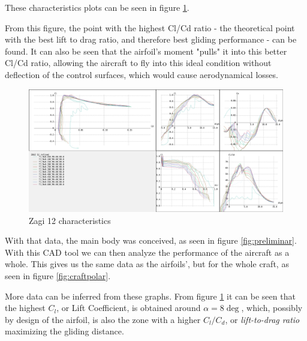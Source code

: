These characteristics plots can be seen in figure \ref{fig:zagi12polares}.
%

From this figure, the point with the highest Cl/Cd ratio - the theoretical point with the best lift to drag ratio, and therefore best gliding performance - can be found. It can also be seen that the airfoil's moment "pulls" it into this better Cl/Cd ratio, allowing the aircraft to fly into this ideal condition without deflection of the control surfaces, which would cause aerodynamical losses.


\begin{figure}
\centering
	  \includegraphics[width=\linewidth]{figs/polares.png}
  \caption{Zagi 12 characteristics}
  \label{fig:zagi12polares}
\end{figure}

With that data, the main body was conceived, as seen in figure \ref{fig:preliminar}. With this CAD tool we can then analyze the performance of the aircraft as a whole. This gives us the same data as the airfoils', but for the whole craft, as seen in figure \ref{fig:craftpolar}.

More data can be inferred from these graphs. From figure \ref{fig:zagi12polares} it can be seen that the highest $C_l$, or Lift Coefficient, is obtained around $\alpha = 8\deg$, which, possibly by design of the airfoil, is also the zone with a higher $C_l/C_d$, or \textit{lift-to-drag ratio} maximizing the gliding distance. 

